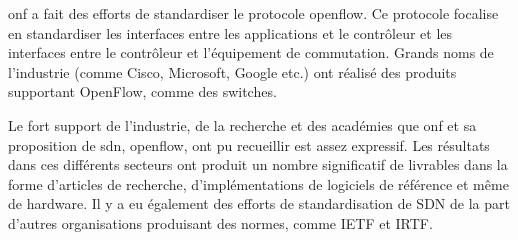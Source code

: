 \gls{onf} a fait des efforts de standardiser le protocole \gls{openflow}. Ce protocole focalise en standardiser les interfaces entre les applications et le contrôleur et les interfaces entre le contrôleur et l'équipement de commutation. Grands noms de l'industrie (comme Cisco, Microsoft, Google etc.) ont réalisé des produits supportant OpenFlow, comme des switches. \cite{SurveySDNArchi} %




Le fort support de l'industrie, de la recherche et des académies que \gls{onf} et sa proposition de \gls{sdn}, \gls{openflow}, ont pu recueillir est assez expressif. Les résultats dans ces différents secteurs ont produit un nombre significatif de livrables dans la forme d'articles de recherche, d'implémentations de logiciels de référence et même de hardware. Il y a eu également des efforts de standardisation de SDN de la part d'autres organisations produisant des normes, comme IETF et IRTF. \cite{SurveySDNIntro}


